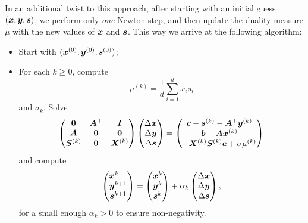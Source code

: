 In an additional twist to this approach, after starting with an initial guess $(\bm{x},\bm{y},\bm{s})$, we perform only {\em one} Newton step, and then update the duality measure $\mu$ with the new values of $\bm{x}$ and $\bm{s}$. This way we arrive at the following algorithm: 
\begin{itemize}
 \item Start with $(\bm{x}^{(0)},\bm{y}^{(0)},\bm{s}^{(0)})$;
 \item For each $k\geq 0$, compute 
 \begin{equation*}
  \mu^{(k)} = \frac{1}{d} \sum_{i=1}^d x_is_i
 \end{equation*}
and $\sigma_k$. Solve
\begin{equation*}
 \begin{pmatrix}
  \bm{0} & \bm{A}^{\top} & \bm{I} \\
  \bm{A} & \bm{0} & \bm{0} \\
  \bm{S}^{(k)} & \bm{0} & \bm{X}^{(k)}
 \end{pmatrix}
\begin{pmatrix} \Delta\bm{x}\\ \Delta \bm{y}\\ \Delta\bm{s} \end{pmatrix} = \begin{pmatrix} \bm{c}-\bm{s}^{(k)}-\bm{A}^{\top}\bm{y}^{(k)}\\ \bm{b}-\bm{A}\bm{x}^{(k)}\\ -\bm{X}^{(k)}\bm{S}^{(k)}\bm{e}+\sigma \mu^{(k)}\end{pmatrix}
\end{equation*}
and compute
\begin{equation*}
\begin{pmatrix} \bm{x}^{k+1}\\ \bm{y}^{k+1}\\ \bm{s}^{k+1}\end{pmatrix}= \begin{pmatrix} \bm{x}^{k}\\ \bm{y}^{k}\\ \bm{s}^{k}\end{pmatrix} +\alpha_k \begin{pmatrix} \Delta\bm{x}\\ \Delta \bm{y}\\ \Delta\bm{s} \end{pmatrix},
 \end{equation*}
for a small enough $\alpha_k>0$ to ensure non-negativity.
\end{itemize}

